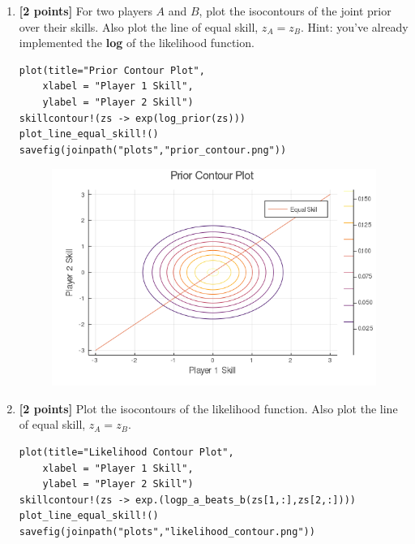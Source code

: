 \documentclass{article}
\begin{document}
\begin{enumerate}[label=(\alph*)]
\item {\bf [2 points]}  For two players $A$ and $B$, plot the isocontours of the joint prior over their skills.  Also plot the line of equal skill, $z_A = z_B$.
  Hint: you've already implemented the \textbf{log} of the likelihood function.

\begin{verbatim}
plot(title="Prior Contour Plot",
    xlabel = "Player 1 Skill",
    ylabel = "Player 2 Skill")
skillcontour!(zs -> exp(log_prior(zs)))
plot_line_equal_skill!()
savefig(joinpath("plots","prior_contour.png"))
\end{verbatim}

\begin{figure}[h]
  \centering
  \includegraphics[width=12cm,keepaspectratio]{plots/prior_contour.png}
\end{figure}

\pagebreak

\item {\bf [2 points]} Plot the isocontours of the likelihood function. 
Also plot the line of equal skill, $z_A = z_B$.

\begin{verbatim}
plot(title="Likelihood Contour Plot",
    xlabel = "Player 1 Skill",
    ylabel = "Player 2 Skill")
skillcontour!(zs -> exp.(logp_a_beats_b(zs[1,:],zs[2,:])))
plot_line_equal_skill!()
savefig(joinpath("plots","likelihood_contour.png"))
\end{verbatim}


\end{enumerate}
\end{document}
